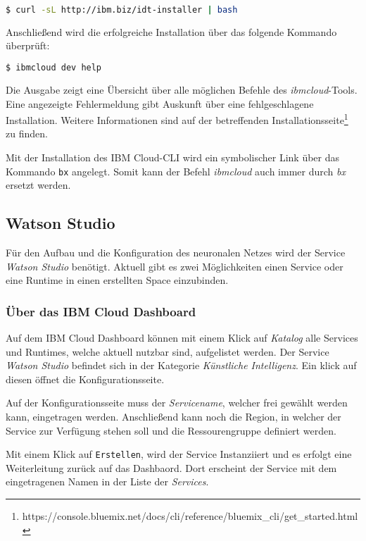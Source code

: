 \begin{lstlisting}[language=bash, caption=Installation des IBM Cloud CLI, label=Installation des IBM Cloud CLI]
    $ curl -sL http://ibm.biz/idt-installer | bash
\end{lstlisting}

Anschließend wird die erfolgreiche Installation über das folgende Kommando überprüft:

\begin{lstlisting}[language=bash, caption=Installation des CLI überprüfen, label=Installation des CLI überprüfen]
    $ ibmcloud dev help
\end{lstlisting}

Die Ausgabe zeigt eine Übersicht über alle möglichen Befehle des \textit{ibmcloud}-Tools. Eine angezeigte Fehlermeldung
gibt Auskunft über eine fehlgeschlagene Installation. Weitere Informationen sind auf der betreffenden
Installationsseite\footnote{https://console.bluemix.net/docs/cli/reference/bluemix\_cli/get\_started.html} zu finden.

Mit der Installation des IBM Cloud-CLI wird ein symbolischer Link über das Kommando \texttt{bx} angelegt. Somit kann der
Befehl \textit{ibmcloud} auch immer durch \textit{bx} ersetzt werden.

\subsection{Watson Studio}
Für den Aufbau und die Konfiguration des neuronalen Netzes wird der Service \textit{Watson Studio} benötigt. Aktuell gibt
es zwei Möglichkeiten einen Service oder eine Runtime in einen erstellten Space einzubinden.

\subsubsection*{Über das IBM Cloud Dashboard}
Auf dem IBM Cloud Dashboard können mit einem Klick auf \textit{Katalog} alle Services und Runtimes, welche aktuell nutzbar
sind, aufgelistet werden. Der Service \textit{Watson Studio} befindet sich in der Kategorie
\textit{Künstliche Intelligenz}. Ein klick auf diesen öffnet die Konfigurationsseite.

Auf der Konfigurationsseite muss der \textit{Servicename}, welcher frei gewählt werden kann, eingetragen werden.
Anschließend kann noch die Region, in welcher der Service zur Verfügung stehen soll und die Ressourengruppe definiert
werden.

Mit einem Klick auf \texttt{Erstellen}, wird der Service Instanziiert und es erfolgt eine Weiterleitung zurück auf das
Dashbaord. Dort erscheint der Service mit dem eingetragenen Namen in der Liste der \textit{Services}.


